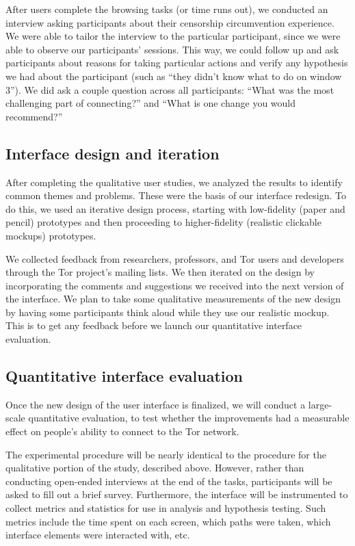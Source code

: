 \documentclass{template}
\begin{document}
After users complete the browsing tasks (or time runs out), we conducted an
interview asking participants about their censorship circumvention experience.
We were able to tailor the interview to the particular participant, since we were able to
observe our participants' sessions. This way, we could follow up and ask participants
about reasons for taking particular actions and verify any hypothesis we had about 
the participant (such as ``they didn't know what to do on window 3'').  We did
ask a couple question across all participants: 
``What was the most challenging part of connecting?''
and
``What is one change you would recommend?''


\subsection{Interface design and iteration}
After completing the qualitative user studies, we analyzed the results to
identify common themes and problems. These were the basis of our interface 
redesign. To do this, we used an iterative design process, starting with low-fidelity
(paper and pencil) prototypes and then proceeding to higher-fidelity (realistic clickable mockups)
prototypes.

We collected feedback from researchers, professors, and Tor users and developers
through the Tor project's mailing lists. We then iterated on the design by
incorporating the comments and suggestions we received into the next version of
the interface. We plan to take some qualitative measurements of the new design
by having some participants think aloud while they use our realistic mockup. This is 
to get any feedback before we launch our quantitative interface evaluation.

\subsection{Quantitative interface evaluation}
Once the new design of the user interface is finalized, we will conduct a
large-scale quantitative evaluation, to test whether the improvements had a
measurable effect on people's ability to connect to the Tor network.

The experimental procedure will be nearly identical to the procedure for the
qualitative portion of the study, described above. However, rather than
conducting open-ended interviews at the end of the tasks, participants will be
asked to fill out a brief survey. Furthermore, the interface will be
instrumented to collect metrics and statistics for use in analysis and
hypothesis testing. Such metrics include the time spent on each screen, which
paths were taken, which interface elements were interacted with, etc.
\end{document}
